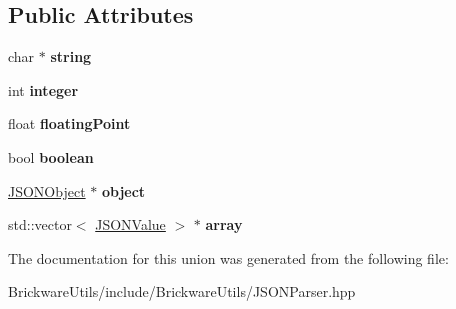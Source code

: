 \subsection*{Public Attributes}
\begin{DoxyCompactItemize}
\item 
\hypertarget{unionBrickware_1_1Utility_1_1JSONValue_ac29412c36a3261500cf975c6e0cbb579}{}char $\ast$ {\bfseries string}\label{unionBrickware_1_1Utility_1_1JSONValue_ac29412c36a3261500cf975c6e0cbb579}

\item 
\hypertarget{unionBrickware_1_1Utility_1_1JSONValue_a0d5a6c5d88a02c4bdfb631bf04740b11}{}int {\bfseries integer}\label{unionBrickware_1_1Utility_1_1JSONValue_a0d5a6c5d88a02c4bdfb631bf04740b11}

\item 
\hypertarget{unionBrickware_1_1Utility_1_1JSONValue_aa26a2d9e09024746cf6760c39d3909c1}{}float {\bfseries floating\+Point}\label{unionBrickware_1_1Utility_1_1JSONValue_aa26a2d9e09024746cf6760c39d3909c1}

\item 
\hypertarget{unionBrickware_1_1Utility_1_1JSONValue_a6dcd63a0869fff519bd06d7b45332f7b}{}bool {\bfseries boolean}\label{unionBrickware_1_1Utility_1_1JSONValue_a6dcd63a0869fff519bd06d7b45332f7b}

\item 
\hypertarget{unionBrickware_1_1Utility_1_1JSONValue_a74062afa584969e5c260d46dd832b8cf}{}\hyperlink{classBrickware_1_1Utility_1_1JSONObject}{J\+S\+O\+N\+Object} $\ast$ {\bfseries object}\label{unionBrickware_1_1Utility_1_1JSONValue_a74062afa584969e5c260d46dd832b8cf}

\item 
\hypertarget{unionBrickware_1_1Utility_1_1JSONValue_a9cb1a48789ed57bc4518791161a0ee2e}{}std\+::vector$<$ \hyperlink{unionBrickware_1_1Utility_1_1JSONValue}{J\+S\+O\+N\+Value} $>$ $\ast$ {\bfseries array}\label{unionBrickware_1_1Utility_1_1JSONValue_a9cb1a48789ed57bc4518791161a0ee2e}

\end{DoxyCompactItemize}


The documentation for this union was generated from the following file\+:\begin{DoxyCompactItemize}
\item 
Brickware\+Utils/include/\+Brickware\+Utils/J\+S\+O\+N\+Parser.\+hpp\end{DoxyCompactItemize}

